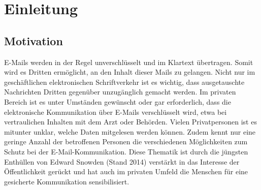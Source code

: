 \documentclass  [paper=a4,
				fontsize=12pt,
				listof=totoc,
				bibliography=totoc
				]{scrreprt}
\begin{document}
	\parindent 0pt %
	
	\pagebreak	%
  \pagestyle{plain}
\begin{small}
  \tableofcontents
	\listoffigures %
	\pagebreak
	\listoftables %
	\pagebreak
	\pagebreak
\end{small}
	\setcounter{page}{1} %
		\pagestyle{fancyplain}
		\fancyhf{}							%
		\renewcommand{\headrulewidth}{0.4pt}
		\footskip =30pt
		\renewcommand{\chaptermark}[1]{\markboth{#1}{}}	%
		\rhead{\nouppercase{\leftmark}}	
		\cfoot{\thepage\ / \pageref{LastPage}}

\chapter{Einleitung}
		\section{Motivation}
		E-Mails werden in der Regel unverschlüsselt und im Klartext übertragen. Somit wird es Dritten ermöglicht, an den Inhalt dieser Mails zu gelangen. Nicht nur im geschäftlichen elektronischen Schriftverkehr ist es wichtig, dass ausgetauschte Nachrichten Dritten gegenüber unzugänglich gemacht werden. Im privaten Bereich ist es unter Umständen gewünscht oder gar erforderlich, dass die elektronische Kommunikation über E-Mails verschlüsselt wird, etwa bei vertraulichen Inhalten mit dem Arzt oder Behörden. Vielen Privatpersonen ist es mitunter unklar, welche Daten mitgelesen werden können. Zudem kennt nur eine geringe Anzahl der betroffenen Personen die verschiedenen Möglichkeiten zum Schutz bei der E-Mail-Kommunikation. Diese Thematik ist durch die jüngsten Enthüllen von Edward Snowden (Stand 2014) verstärkt in das Interesse der Öffentlichkeit gerückt und hat auch im privaten Umfeld die Menschen für eine gesicherte Kommunikation sensibilisiert.
		
\end{document}
